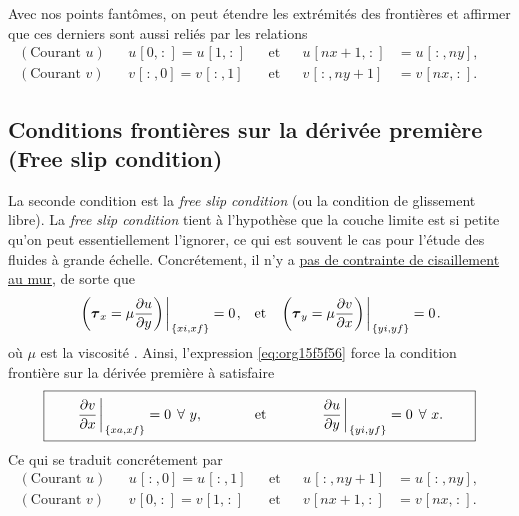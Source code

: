 \documentclass[10pt]{report}
\numberwithin{equation}{section}
\newcommand{\venti}{\vphantom{\sum_x^x}}
\newcommand{\pt}{\hspace{1pt}} %
\begin{document}
Avec nos points fantômes, on peut étendre les extrémités des frontières et affirmer que ces derniers sont aussi reliés par les relations
\begin{subequations}
\begin{align}
(\text{Courant }u) &&  u\pt[0,\pt:\pt] = u\pt[1,\pt:\pt] && \text{et} && u\pt[nx+1,\pt:\pt] &= u\pt[\pt:\pt,ny],&&\\
(\text{Courant }v) &&  v\pt[\pt:\pt,0] = v\pt[\pt:\pt,1] && \text{et} && v\pt[\pt:\pt,ny+1] &= v\pt[nx,\pt:\pt].&&
\end{align}
\end{subequations}

\subsection{Conditions frontières sur la dérivée première (Free slip condition)}
\label{sec:org4132589}

La seconde condition est la \emph{free slip condition} (ou la condition de glissement libre).
La \emph{free slip condition} tient à l'hypothèse que la couche limite est si petite qu'on peut essentiellement l'ignorer, ce qui est souvent le cas pour l'étude des fluides à grande échelle.
Concrétement, il n'y a \href{https://physics.stackexchange.com/questions/383096/understanding-free-slip-boundary-condition\#:\~:text=On\%20the\%20other\%20hand\%2C\%20the,the\%20tangential\%20component\%20is\%20unrestricted.}{pas de contrainte de cisaillement au mur}, de sorte que
\begin{align}
\label{eq:org15f5f56}
&&\eval{\qty(\boldsymbol{\tau}_x = \mu \pdv{u}{y})\pt }_{\pt\{xi,xf\}} = 0\pt, && \text{et} &&
  \eval{\qty(\boldsymbol{\tau}_y = \mu \pdv{v}{x})\pt }_{\pt\{yi,yf\}} = 0\pt. &&
\end{align}
où \(\mu\) est la viscosité \autocite{tan2018applying}.
Ainsi, l'expression \ref{eq:org15f5f56} force la condition frontière sur la dérivée première à satisfaire 
\begin{equation}
\boxed{\hspace{0.7cm}\eval{\pdv{v}{x}\pt }_{\pt\{xa,xf\}} = 0\pt\ \forall\ y,\hspace{1.3cm} \text{et} \hspace{1.3cm} \eval{\pdv{u}{y}\pt }_{\pt \{yi,yf\}} = 0\pt\ \forall\ x.\hspace{0.7cm}\venti}
\end{equation}
Ce qui se traduit concrétement par
\begin{subequations}
\begin{align}
(\text{Courant }u) &&  u\pt[\pt:\pt,0] = u\pt[\pt:\pt,1] && \text{et} && u\pt[\pt:\pt,ny+1] &= u\pt[\pt:\pt,ny],&&\\
(\text{Courant }v) &&  v\pt[0,\pt:\pt] = v\pt[1,\pt:\pt] && \text{et} && v\pt[nx+1,\pt:\pt] &= v\pt[nx,\pt:\pt].&&
\end{align}
\end{subequations}
\end{document}
